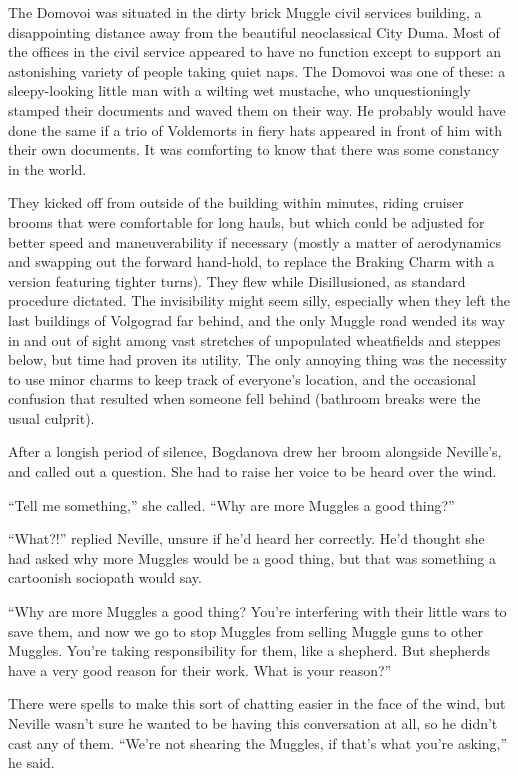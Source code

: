 The Domovoi was situated in the dirty brick Muggle civil services
building, a disappointing distance away from the beautiful neoclassical
City Duma. Most of the offices in the civil service appeared to have no
function except to support an astonishing variety of people taking quiet
naps. The Domovoi was one of these: a sleepy-looking little man with a
wilting wet mustache, who unquestioningly stamped their documents and
waved them on their way. He probably would have done the same if a trio
of Voldemorts in fiery hats appeared in front of him with their own
documents. It was comforting to know that there was some constancy in
the world.

They kicked off from outside of the building within minutes, riding
cruiser brooms that were comfortable for long hauls, but which could be
adjusted for better speed and maneuverability if necessary (mostly a
matter of aerodynamics and swapping out the forward hand-hold, to
replace the Braking Charm with a version featuring tighter turns). They
flew while Disillusioned, as standard procedure dictated. The
invisibility might seem silly, especially when they left the last
buildings of Volgograd far behind, and the only Muggle road wended its
way in and out of sight among vast stretches of unpopulated wheatfields
and steppes below, but time had proven its utility. The only annoying
thing was the necessity to use minor charms to keep track of everyone's
location, and the occasional confusion that resulted when someone fell
behind (bathroom breaks were the usual culprit).

After a longish period of silence, Bogdanova drew her broom alongside
Neville's, and called out a question. She had to raise her voice to be
heard over the wind.

``Tell me something,'' she called. ``Why are more Muggles a good
thing?''

``What?!'' replied Neville, unsure if he'd heard her correctly. He'd
thought she had asked why more Muggles would be a good thing, but that
was something a cartoonish sociopath would say.

``Why are more Muggles a good thing? You're interfering with their
little wars to save them, and now we go to stop Muggles from selling
Muggle guns to other Muggles. You're taking responsibility for them,
like a shepherd. But shepherds have a very good reason for their work.
What is your reason?''

There were spells to make this sort of chatting easier in the face of
the wind, but Neville wasn't sure he wanted to be having this
conversation at all, so he didn't cast any of them. ``We're not shearing
the Muggles, if that's what you're asking,'' he said.

